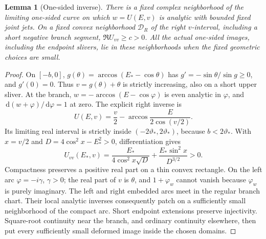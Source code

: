 \documentclass[11pt]{article}
\numberwithin{equation}{section}
\newtheorem{lemma}[theorem]{Lemma}
\theoremstyle{definition}
\newcommand{\dd}{\,\mathrm d}
\begin{document}
\begin{lemma}[One-sided inverse]\label{lem:iso-inverse}
There is a fixed complex neighborhood of the limiting one-sided
curve on which $w=U({E},v)$ is analytic with bounded fixed
joint jets.  On a fixed convex neighborhood $\mathcal D_R$ of the
right $v$-interval, including a short negative branch segment,
$\Re U_{vv}\ge c>0$.  All the actual one-sided images, including
the endpoint slivers, lie in these neighborhoods when the fixed
geometric choices are small.
\end{lemma}
\begin{proof}
On $[-b,0]$, $g(\theta)=\arccos({E}_*-\cos\theta)$ has
$g'=-\sin\theta/\sin g\ge0$, and $g'(0)=0$.
Thus $v=g(\theta)+\theta$ is strictly increasing, also on a short
upper sliver.  At the branch,
$w=-\arccos({E}-\cos\varphi)$ is even analytic in
$\varphi$, and $\dd(w+\varphi)/\dd\varphi=1$ at zero.
The explicit right inverse is
\begin{equation}\label{eq:iso-inverse-explicit}
 U({E},v)=\frac v2-
       \arccos\frac{{E}}{2\cos(v/2)}.
\end{equation}
Its limiting real interval is strictly inside $(-2\vartheta_*,2\vartheta_*)$,
because $b<2\vartheta_*$.  With $x=v/2$ and
$D=4\cos^2x-{E}_*^2>0$, differentiation gives
\[
 U_{vv}({E}_*,v)
 =\frac{{E}_*}{4\cos^2x\sqrt D}
      +\frac{{E}_*\sin^2x}{D^{3/2}}>0.
\]
Compactness preserves a positive real part on a thin convex rectangle.
On the left arc $\varphi=-i\gamma$, $\gamma>0$; the real part of $v$
is $\theta$, and $1+\varphi_w$ cannot vanish because $\varphi_w$
is purely imaginary.  The left and right embedded arcs meet in the
regular branch chart.  Their local analytic inverses consequently
patch on a sufficiently small neighborhood of the compact arc.
Short endpoint extensions preserve injectivity.  Square-root
continuity near the branch, and ordinary continuity elsewhere, then
put every sufficiently small deformed image inside the chosen domains.
\end{proof}
\end{document}

